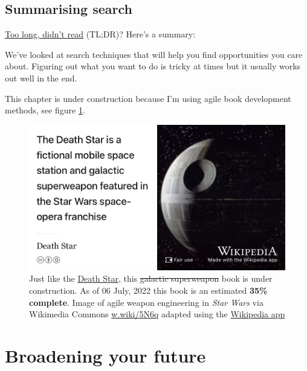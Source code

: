 \documentclass[
]{book}
\begin{document}
\hypertarget{tldr8}{%
\section{Summarising search}\label{tldr8}}

\href{https://en.wiktionary.org/wiki/too_long;_didn\%27t_read}{Too long, didn't read} (TL;DR)? Here's a summary:

We've looked at search techniques that will help you find opportunities you care about. Figuring out what you want to do is tricky at times but it usually works out well in the end.

This chapter is under construction because I'm using agile book development methods, see figure \ref{fig:deathstar5-fig}.

\begin{figure}

{\centering \includegraphics[width=0.99\linewidth]{images/DeathStar2} 

}

\caption{Just like the \href{https://en.wikipedia.org/wiki/Death_Star}{Death Star}, this \sout{galactic superweapon} book is under construction. As of 06 July, 2022 this book is an estimated \textbf{35\% complete}. Image of agile weapon engineering in \emph{Star Wars} via Wikimedia Commons \href{https://w.wiki/5N6q}{w.wiki/5N6q} adapted using the \href{https://apps.apple.com/gb/app/wikipedia/id324715238}{Wikipedia app}}\label{fig:deathstar5-fig}
\end{figure}

\hypertarget{broadening}{%
\chapter{Broadening your future}\label{broadening}}
\end{document}
